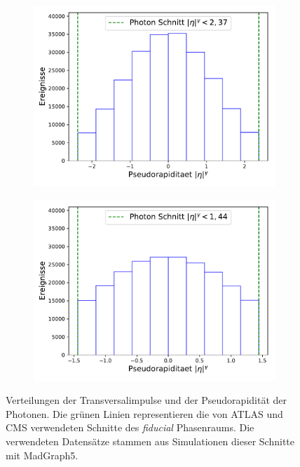 \begin{figure}
\begin{subfigure}[c]{0.5\textwidth}
      \includegraphics[width=\textwidth]{Plots/photon_eta_Atlas.pdf}
    \end{subfigure}
    \begin{subfigure}[c]{0.5\textwidth}
      \includegraphics[width=\textwidth]{Plots/photon_eta_Cms.pdf}
    \end{subfigure}
    \caption{Verteilungen der Transversalimpulse und der Pseudorapidität der Photonen. Die grünen Linien representieren die von ATLAS und CMS verwendeten Schnitte des \textit{fiducial} Phasenraums. Die verwendeten Datensätze stammen aus Simulationen dieser Schnitte mit MadGraph5.}
    \label{fig:schnitte}
\end{figure}
